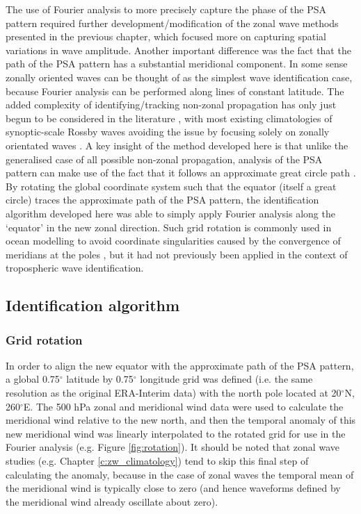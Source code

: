The use of Fourier analysis to more precisely capture the phase of the PSA pattern required further development/modification of the zonal wave methods presented in the previous chapter, which focused more on capturing spatial variations in wave amplitude. Another important difference was the fact that the path of the PSA pattern has a substantial meridional component. In some sense zonally oriented waves can be thought of as the simplest wave identification case, because Fourier analysis can be performed along lines of constant latitude. The added complexity of identifying/tracking non-zonal propagation has only just begun to be considered in the literature \citep[e.g.][]{Zimin2006,Souders2014}, with most existing climatologies of synoptic-scale Rossby waves avoiding the issue by focusing solely on zonally orientated waves \citep[e.g.][]{Glatt2014}. A key insight of the method developed here is that unlike the generalised case of all possible non-zonal propagation, analysis of the PSA pattern can make use of the fact that it follows an approximate great circle path \citep{Hoskins1981}. By rotating the global coordinate system such that the equator (itself a great circle) traces the approximate path of the PSA pattern, the identification algorithm developed here was able to simply apply Fourier analysis along the `equator' in the new zonal direction. Such grid rotation is commonly used in ocean modelling to avoid coordinate singularities caused by the convergence of meridians at the poles \citep[i.e. the grid is rotated to place the north pole over a continent; e.g.][]{Bonaventura2012}, but it had not previously been applied in the context of tropospheric wave identification.

\subsection{Identification algorithm}\label{s:psa_id}

\subsubsection{Grid rotation}

In order to align the new equator with the approximate path of the PSA pattern, a global 0.75$^{\circ}$ latitude by 0.75$^{\circ}$ longitude grid was defined (i.e. the same resolution as the original ERA-Interim data) with the north pole located at 20$^{\circ}$N, 260$^{\circ}$E. The 500 hPa zonal and meridional wind data were used to calculate the meridional wind relative to the new north, and then the temporal anomaly of this new meridional wind was linearly interpolated to the rotated grid for use in the Fourier analysis (e.g. Figure \ref{fig:rotation}). It should be noted that zonal wave studies (e.g. Chapter \ref{c:zw_climatology}) tend to skip this final step of calculating the anomaly, because in the case of zonal waves the temporal mean of the meridional wind is typically close to zero (and hence waveforms defined by the meridional wind already oscillate about zero). 

